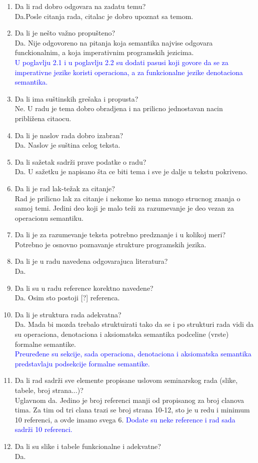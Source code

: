 \documentclass[a4paper]{report}
\newcommand{\odgovor}[1]{\textcolor{blue}{#1}}
\begin{document}
\begin{enumerate}
\item Da li rad dobro odgovara na zadatu temu?\\
Da.Posle citanja rada, citalac je dobro upoznat sa temom.
\item Da li je nešto važno propušteno?\\
Da. Nije odgovoreno na pitanja koja semantika najvise odgovara funckionalnim, a koja imperativnim programskih jezicima.\\
\odgovor{U poglavlju 2.1 i u poglavlju 2.2 su dodati pasusi koji govore da se za imperativne jezike koristi operaciona, a za funkcionalne jezike denotaciona semantika.}
\item Da li ima suštinskih grešaka i propusta?\\
Ne. U radu je tema dobro obradjena i na prilicno jednostavan nacin približena citaocu.
\item Da li je naslov rada dobro izabran?\\
Da. Naslov je suština celog teksta.
\item Da li sažetak sadrži prave podatke o radu?\\
Da. U sažetku je napisano šta ce biti tema i sve je dalje u tekstu pokriveno.
\item Da li je rad lak-težak za citanje?\\
Rad je prilicno lak za citanje i nekome ko nema mnogo strucnog znanja o samoj temi. Jedini deo koji je malo teži za razumevanje je deo vezan za operacionu semantiku.
\item Da li je za razumevanje teksta potrebno predznanje i u kolikoj meri?\\
Potrebno je osnovno poznavanje strukture programskih jezika.
\item Da li je u radu navedena odgovarajuca literatura?\\
Da.
\item Da li su u radu reference korektno navedene?\\
Da. Osim sto postoji [?] referenca. 
\item Da li je struktura rada adekvatna?\\
Da. Mada bi mozda trebalo struktuirati tako da se i po strukturi rada vidi da su operaciona, denotaciona i aksiomatska semantika podceline (vrste) formalne semantike.\\
\odgovor{Preuređene su sekcije, sada operaciona, denotaciona i aksiomatska semantika predstavlaju podsekcije formalne semantike.}
\item Da li rad sadrži sve elemente propisane uslovom seminarskog rada (slike, tabele, broj strana...)?\\
Uglavnom da. Jedino je broj referenci manji od propisanog za broj clanova tima. Za tim od tri clana trazi se broj strana 10-12, sto je u redu i minimum 10 referenci, a ovde imamo svega 6.
\odgovor{Dodate su neke reference i rad sada sadrži 10 referenci.}
\item Da li su slike i tabele funkcionalne i adekvatne?\\
Da.
\end{enumerate}
\end{document}
